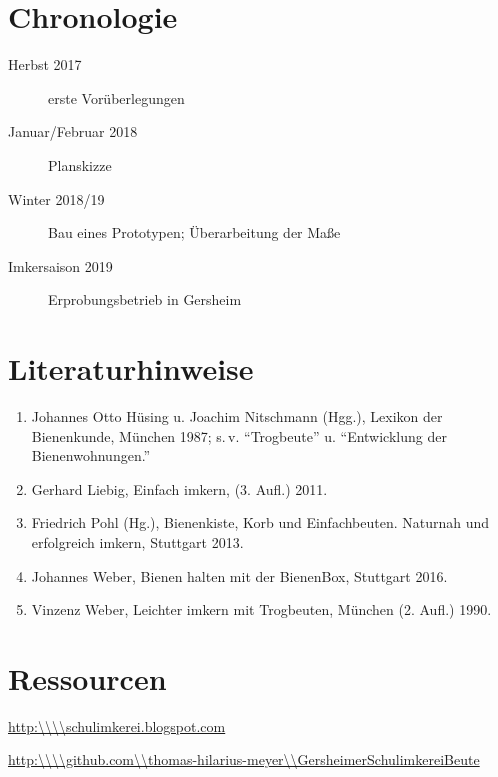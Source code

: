 \documentclass[12pt,a4paper,ngerman]{scrartcl}
\begin{document}
\section{Chronologie}

\begin{description}
\item[Herbst 2017] erste Vorüberlegungen
\item[Januar/Februar 2018] Planskizze
\item[Winter 2018/19] Bau eines Prototypen; Überarbeitung der Maße
\item[Imkersaison 2019] Erprobungsbetrieb in Gersheim
\end{description}


\section{Literaturhinweise}

\begin{enumerate}
\item Johannes Otto Hüsing u. Joachim Nitschmann (Hgg.), Lexikon der Bienenkunde, München 1987; s.\,v.
  \enquote{Trogbeute} u.
  \enquote{Entwicklung der Bienenwohnungen.}
\item Gerhard Liebig, Einfach imkern, (3. Aufl.) 2011.
\item Friedrich Pohl (Hg.), Bienenkiste, Korb und Einfachbeuten. Naturnah und erfolgreich imkern, Stuttgart 2013.
\item Johannes Weber, Bienen halten mit der BienenBox, Stuttgart 2016.
\item Vinzenz Weber, Leichter imkern mit Trogbeuten, München (2. Aufl.) 1990.
\end{enumerate}


\section{Ressourcen}

\url{http:\\\\schulimkerei.blogspot.com}

\url{http:\\\\github.com\\thomas-hilarius-meyer\\GersheimerSchulimkereiBeute}
\end{document}
